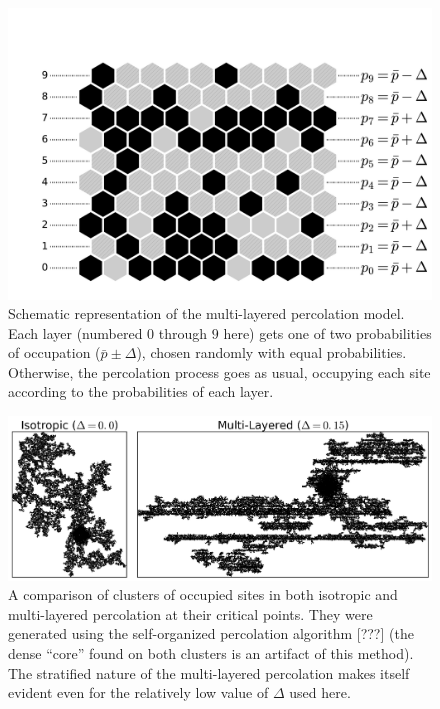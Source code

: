 \begin{figure}
\begin{center}
    \includegraphics[scale=0.4]{chapters/ch5-anis/figs/mlperco_explain}
\end{center}
\caption{Schematic representation of the multi-layered percolation model. Each
    layer (numbered $0$ through $9$ here) gets one of two probabilities of
    occupation ($\bar{p}\pm\Delta$), chosen randomly with equal probabilities.
    Otherwise, the percolation process goes as usual, occupying each site
    according to the probabilities of each layer.}
\label{fig:mlperco_explain}
\end{figure}

\begin{figure}
\begin{center}
    \includegraphics[scale=0.6]{chapters/ch5-anis/figs/mlp_cluster}
\end{center}
\caption{A comparison of clusters of occupied sites in both isotropic and
    multi-layered percolation at their critical points. They were generated
    using the self-organized percolation algorithm [???] (the dense ``core''
    found on both clusters is an artifact of this method). The stratified
    nature of the multi-layered percolation makes itself evident even for the
    relatively low value of $\Delta$ used here.}
\label{fig:mlp_cluster}
\end{figure}

